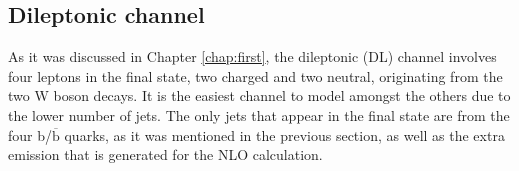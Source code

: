 \subsection{\label{DL}Dileptonic channel}
\noindent As it was discussed in Chapter \ref{chap:first}, the dileptonic (DL) channel involves four leptons in the final state, two charged and two neutral, originating from the two W boson decays. It is the easiest channel to model amongst the others due to the lower number of jets. The only jets that appear in the final state are from the four b/$\overline{\text{b}}$ quarks, as it was mentioned in the previous section, as well as the extra emission that is generated for the NLO calculation.\\
\newpage
\clearpage
   \thispagestyle{empty}
